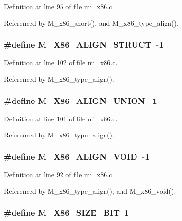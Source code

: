 Definition at line 95 of file mi\_\-x86.c.

Referenced by M\_\-x86\_\-short(), and M\_\-x86\_\-type\_\-align().
\subsubsection{\setlength{\rightskip}{0pt plus 5cm}\#define M\_\-X86\_\-ALIGN\_\-STRUCT~-1}\label{mi__x86_8c_6e3eb9aa2fea64652019b04a5e82f5b3}




Definition at line 102 of file mi\_\-x86.c.

Referenced by M\_\-x86\_\-type\_\-align().
\subsubsection{\setlength{\rightskip}{0pt plus 5cm}\#define M\_\-X86\_\-ALIGN\_\-UNION~-1}\label{mi__x86_8c_fefe62d7492d8aa3e26ca4bf1385008b}




Definition at line 101 of file mi\_\-x86.c.

Referenced by M\_\-x86\_\-type\_\-align().
\subsubsection{\setlength{\rightskip}{0pt plus 5cm}\#define M\_\-X86\_\-ALIGN\_\-VOID~-1}\label{mi__x86_8c_5f71411e8ef673d8493945e281e15f43}




Definition at line 92 of file mi\_\-x86.c.

Referenced by M\_\-x86\_\-type\_\-align(), and M\_\-x86\_\-void().
\subsubsection{\setlength{\rightskip}{0pt plus 5cm}\#define M\_\-X86\_\-SIZE\_\-BIT~1}\label{mi__x86_8c_ccec9c11fef4d459ff0440737aec8dc1}




